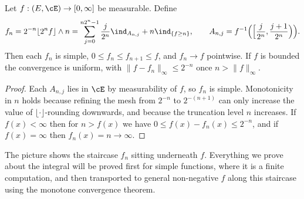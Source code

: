 \begin{proposition}\label{prop:std-approx}
	Let $f : (E,\cE) \to [0,\infty]$ be measurable. Define
	$$
	f_n = 2^{-n}\lfloor 2^n f \rfloor \wedge n = \sum_{j=0}^{n2^n - 1} \frac{j}{2^n}\ind_{A_{n,j}} + n \ind_{\{f \geq n\}}, \qquad A_{n,j} = f^{-1}\Big( \Big[ \frac{j}{2^n}, \frac{j+1}{2^n}\Big)\Big).
	$$
	Then each $f_n$ is simple, $0 \leq f_n \leq f_{n+1} \leq f$, and $f_n \to f$ pointwise. If $f$ is bounded the convergence is uniform, with $\|f - f_n\|_\infty \leq 2^{-n}$ once $n > \|f\|_\infty$.
\end{proposition}
\begin{proof}
	Each $A_{n,j}$ lies in $\cE$ by measurability of $f$, so $f_n$ is simple. Monotonicity in $n$ holds because refining the mesh from $2^{-n}$ to $2^{-(n+1)}$ can only increase the value of $\lfloor \cdot \rfloor$-rounding downwards, and because the truncation level $n$ increases. If $f(x) < \infty$ then for $n > f(x)$ we have $0 \leq f(x) - f_n(x) \leq 2^{-n}$, and if $f(x) = \infty$ then $f_n(x) = n \to \infty$.
\end{proof}

\begin{center}
\end{center}

The picture shows the staircase $f_n$ sitting underneath $f$. Everything we prove about the integral will be proved first for simple functions, where it is a finite computation, and then transported to general non-negative $f$ along this staircase using the monotone convergence theorem.

